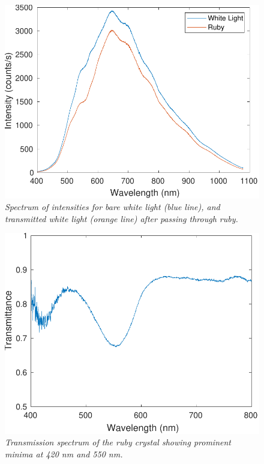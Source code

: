 \documentclass[11pt, a4paper, twocolumn]{article}
\begin{document}
\begin{figure} %
\includegraphics[width=\linewidth]{doubleIntensityMeasurement.pdf}
\caption{\textit{Spectrum of intensities for bare white light (blue line), and transmitted white light (orange line) after passing through ruby.}}
\label{fig:doubleIntensityMeasurement}
\end{figure}

\begin{figure} %
\includegraphics[width=\linewidth]{transmissionSpectrum.pdf}
\caption{\textit{Transmission spectrum of the ruby crystal showing prominent minima at 420 nm and 550 nm.}}
\label{fig:transmissionSpectrum}
\end{figure}
\end{document}
